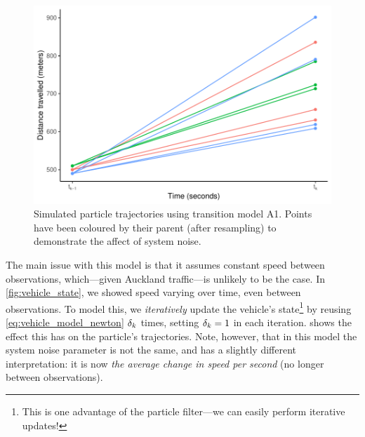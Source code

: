 \begin{knitrout}\small
{}\color{fgcolor}\begin{figure}

{\centering \includegraphics[width=.8\textwidth]{figure/transition_a1_demo-1} 

}

\caption[Simulated particle trajectories using transition model A1]{Simulated particle trajectories using transition model A1. Points have been coloured by their parent (after resampling) to demonstrate the affect of system noise.}\label{fig:transition_a1_demo}
\end{figure}


\end{knitrout}

The main issue with this model is that it assumes constant speed between observations, which---given Auckland traffic---is unlikely to be the case. In \cref{fig:vehicle_state}, we showed speed varying over time, even between observations. To model this, we \emph{iteratively} update the vehicle's state\footnote{This is one advantage of the particle filter---we can easily perform iterative updates!} by reusing \cref{eq:vehicle_model_newton} $\delta_k$ times, setting $\delta_k=1$ in each iteration.  shows the effect this has on the particle's trajectories. Note, however, that in this model the system noise parameter is not the same, and has a slightly different interpretation: it is now \emph{the average change in speed per second} (no longer between observations).

